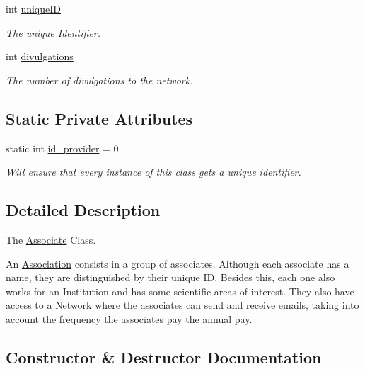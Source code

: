 \begin{DoxyCompactItemize}
int \mbox{\hyperlink{classAssociate_a55a1f311ac7cb8020e9631f283cb74e6}{unique\+ID}}
\begin{DoxyCompactList}\small\item\em The unique Identifier. \end{DoxyCompactList}\item 
int \mbox{\hyperlink{classAssociate_a5f697e757ce7e1be1ed4a2421679b804}{divulgations}}
\begin{DoxyCompactList}\small\item\em The number of divulgations to the network. \end{DoxyCompactList}\end{DoxyCompactItemize}
\subsection*{Static Private Attributes}
\begin{DoxyCompactItemize}
\item 
static int \mbox{\hyperlink{classAssociate_a9fcd0a229b70369a3f6beaf7a02fe58f}{id\+\_\+provider}} = 0
\begin{DoxyCompactList}\small\item\em Will ensure that every instance of this class gets a unique identifier. \end{DoxyCompactList}\end{DoxyCompactItemize}


\subsection{Detailed Description}
The \mbox{\hyperlink{classAssociate}{Associate}} Class. 

An \mbox{\hyperlink{classAssociation}{Association}} consists in a group of associates. Although each associate has a name, they are distinguished by their unique ID. Besides this, each one also works for an Institution and has some scientific areas of interest. They also have access to a \mbox{\hyperlink{classNetwork}{Network}} where the associates can send and receive emails, taking into account the frequency the associates pay the annual pay. 

\subsection{Constructor \& Destructor Documentation}
\mbox{\label{classAssociate_a624e687ad91b6311e7e493adab0a9adc}} 
